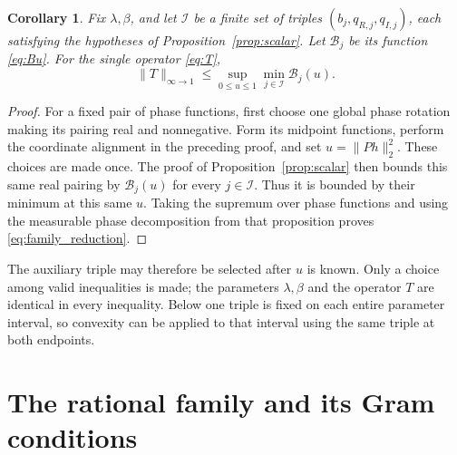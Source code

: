 \documentclass[11pt]{article}
\newtheorem{corollary}[theorem]{Corollary}
\theoremstyle{remark}\newtheorem{remark}[theorem]{Remark}
\newcommand{\norm}[1]{\lVert #1\rVert}
\begin{document}
\begin{corollary}\label{cor:family}
Fix \(\lambda,\beta\), and let \(\mathcal I\) be a finite set of
triples \((b_j,q_{R,j},q_{I,j})\), each satisfying the hypotheses
of Proposition~\ref{prop:scalar}. Let \(\mathcal B_j\) be its function
\eqref{eq:Bu}. For the single operator \eqref{eq:T},
\begin{equation}\label{eq:family_reduction}
\norm T_{\infty\to1}\le
\sup_{0\le u\le1}\min_{j\in\mathcal I}\mathcal B_j(u).
\end{equation}
\end{corollary}
\begin{proof}
For a fixed pair of phase functions, first choose one global phase
rotation making its pairing real and nonnegative. Form its midpoint
functions, perform the coordinate alignment in the preceding proof,
and set \(u=\norm{Ph}_2^2\). These choices are made once. The proof
of Proposition~\ref{prop:scalar} then bounds this same real pairing
by \(\mathcal B_j(u)\) for every \(j\in\mathcal I\). Thus it is
bounded by their minimum at this same \(u\). Taking the supremum
over phase functions and using the measurable phase decomposition
from that proposition proves \eqref{eq:family_reduction}.
\end{proof}

The auxiliary triple may therefore be selected after \(u\) is known.
Only a choice among valid inequalities is made; the parameters
\(\lambda,\beta\) and the operator \(T\) are identical in every
inequality. Below one triple is fixed on each entire parameter
interval, so convexity can be applied to that interval using the
same triple at both endpoints.

\section{The rational family and its Gram conditions}
\end{document}
